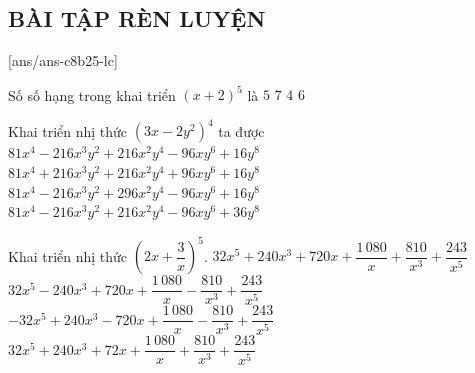 \subsection{BÀI TẬP RÈN LUYỆN}
 
\setcounter{ex}{0}
[ans/ans-c8b25-lc]
\begin{ex}%
	Số số hạng trong khai triển $(x+2)^{5}$ là
	\choice
	{$5$}
	{$7$}
	{$4$}
	{\True $6$}
\end{ex}
\begin{ex}%
	Khai triển nhị thức $\left(3x-2y^2\right)^4$ ta được
	\choice
	{\True $81x^4-216x^3y^2+216x^2y^4-96x y^6+16y^8$}
	{$81x^4+216x^3y^2+216x^2y^4+96x y^6+16y^8$}
	{$81x^4-216x^3y^2+296x^2y^4-96x y^6+16y^8$}
	{$81x^4-216x^3y^2+216x^2y^4-96x y^6+36y^8$}
\end{ex}
\begin{ex}%
	Khai triển nhị thức $\left(2x+\dfrac{3}{x}\right)^5$.
	\choice
	{\True $32x^5+240x^3+720x+\dfrac{1\,080}
	{x}+\dfrac{810}
	{x^3}+\dfrac{243}
	{x^5}$}
	{$32x^5-240x^3+720x+\dfrac{1\,080}{x}-\dfrac{810}{x^3}+\dfrac{243}{x^5}$}
	{$-32x^5+240x^3-720x+\dfrac{1\,080}{x}-\dfrac{810}{x^3}+\dfrac{243}{x^5}$}
	{$32x^5+240x^3+72x+\dfrac{1\,080}{x}+\dfrac{810}{x^3}+\dfrac{243}{x^5}$}
\end{ex}
